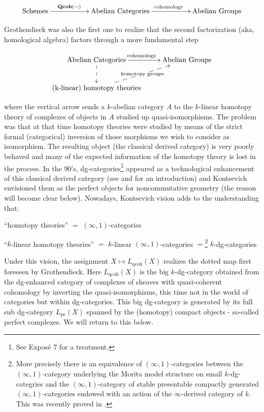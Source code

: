 \begin{refsection}
$$
\xymatrix{
\mathrm{Schemes} \ar[rr]^(0.4){\Qcoh(-)}&& \text{Abelian Categories}\ar[rr]^{\text{cohomology}}&& \text{Abelian Groups} 
}
$$

Grothendieck was also the first one to realize that the second factorization (aka, homological algebra) factors through a more fundamental step

$$
\xymatrix{
\text{Abelian Categories}\ar@{-->}[d]\ar[r]^{\text{cohomology}}& \text{Abelian Groups} \\
\text{(k-linear) homotopy theories}\ar@{-->}[ru]|-{\text{homotopy groups}}&
}
$$

\noindent where the vertical arrow sends a $k$-abelian category $A$ to the $k$-linear homotopy theory of complexes of objects in $A$ studied up quasi-isomorphisms. 
The problem was that at that time homotopy theories were studied by means of the strict formal (categorical) inversion of those morphisms we wish to consider as isomorphism. The resulting object (the classical derived category) is very poorly behaved and many of the expected information of the homotopy theory is lost in the process. In the 90's, dg-categories\footnote{See Expos\'e 7 for a treatment.} appeared as a technological enhancement of this classical derived category (see \cite{bondal-kapranov3,bondal-kapranov2,bondal-kapranov} and \cite{ondgcategories, sedano} for an introduction) and Kontsevich envisioned them as the perfect objects for noncommutative geometry (the reason will become clear below). Nowadays, Kontsevich vision adds to the understanding that:\\

\begin{center}
``homotopy theories'' $=$ $(\infty,1)$-categories\\
\end{center}

\begin{center}
``$k$-linear homotopy theories'' $=$ $k$-linear $(\infty,1)$-categories $=$\footnote{More precisely there is an equivalence of $(\infty,1)$-categories between the $(\infty,1)$-category underlying the Morita model structure on small $k$-dg-categries and the $(\infty,1)$-category of stable presentable compactly generated $(\infty,1)$-categories endowed with an action of the $\infty$-derived category of $k$.  This was recently proved in \cite{dgklinear}.} $k$-dg-categories\\
\end{center}


Under this vision, the assignment $X\mapsto L_{\mathrm{qcoh}}(X)$ realizes the dotted map first foreseen by Grothendieck. Here $L_{\mathrm{qcoh}}(X)$ is the big $k$-dg-category obtained from the dg-enhanced category of complexes of sheaves with quasi-coherent cohomology by inverting the quasi-isomorphisms, this time not in the world of categories but within dg-categories. This big dg-category is generated by its full sub dg-category $L_\mathrm{pe}(X)$ spanned by the (homotopy) compact objects - so-called perfect complexes. We will return to this below. \\


\end{refsection}
